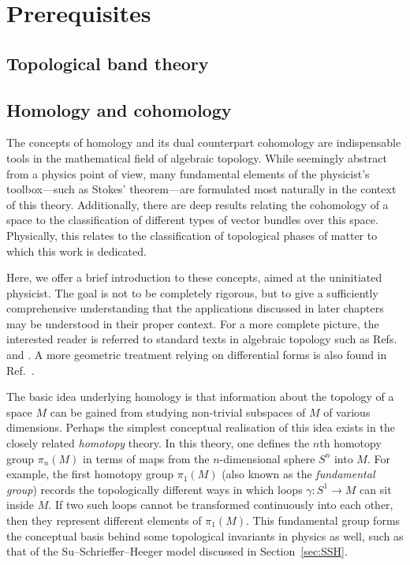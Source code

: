 \chapter{Prerequisites}


\section{Topological band theory}


\section{Homology and cohomology}\label{sec:homology-cohomology}

The concepts of homology and its dual counterpart cohomology are indispensable tools in the mathematical field of algebraic topology. While seemingly abstract from a physics point of view, many fundamental elements of the physicist's toolbox---such as Stokes' theorem---are formulated most naturally in the context of this theory. Additionally, there are deep results relating the cohomology of a space to the classification of different types of vector bundles over this space. Physically, this relates to the classification of topological phases of matter to which this work is dedicated.

Here, we offer a brief introduction to these concepts, aimed at the uninitiated physicist. The goal is not to be completely rigorous, but to give a sufficiently comprehensive understanding that the applications discussed in later chapters may be understood in their proper context. For a more complete picture, the interested reader is referred to standard texts in algebraic topology such as Refs.~\cite{Hatcher_algebraic-topology} and \cite{Bredon_topo-geometry}. A more geometric treatment relying on differential forms is also found in Ref.~\cite{Bott-Tu_differential-forms}. %

The basic idea underlying homology is that information about the topology of a space $M$ can be gained from studying non-trivial subspaces of $M$ of various dimensions. Perhaps the simplest conceptual realisation of this idea exists in the closely related \emph{homotopy} theory. In this theory, one defines the $n$th homotopy group $\pi_n(M)$ in terms of maps from the $n$-dimensional sphere $S^n$ into $M$. For example, the first homotopy group $\pi_1(M)$ (also known as the \emph{fundamental group}) records the topologically different ways in which loops $\gamma:S^1\to M$ can sit inside $M$. If two such loops cannot be transformed continuously into each other, then they represent different elements of $\pi_1(M)$. This fundamental group forms the conceptual basis behind some topological invariants in physics as well, such as that of the Su--Schrieffer--Heeger model discussed in Section~\ref{sec:SSH}.

